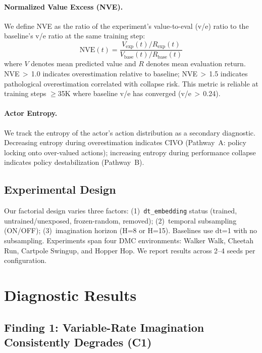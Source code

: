 \documentclass{article}
\newcommand{\dt}{\mathrm{dt}}
\newcommand{\nve}{\text{NVE}}
\begin{document}
\paragraph{Normalized Value Excess (NVE).}
We define NVE as the ratio of the experiment's value-to-eval (v/e) ratio to the baseline's v/e ratio at the same training step:
\begin{equation}
\nve(t) = \frac{V_{\text{exp}}(t) / R_{\text{exp}}(t)}{V_{\text{base}}(t) / R_{\text{base}}(t)}
\end{equation}
where $V$ denotes mean predicted value and $R$ denotes mean evaluation return.
NVE\,$>$\,1.0 indicates overestimation relative to baseline; NVE\,$>$\,1.5 indicates pathological overestimation correlated with collapse risk.
This metric is reliable at training steps $\geq$35K where baseline v/e has converged (v/e\,$>$\,0.24).

\paragraph{Actor Entropy.}
We track the entropy of the actor's action distribution as a secondary diagnostic.
Decreasing entropy during overestimation indicates CIVO (Pathway~A: policy locking onto over-valued actions); increasing entropy during performance collapse indicates policy destabilization (Pathway~B).

\subsection{Experimental Design}

Our factorial design varies three factors:
(1)~\texttt{dt\_embedding} status (trained, untrained/unexposed, frozen-random, removed);
(2)~temporal subsampling (ON/OFF);
(3)~imagination horizon (H=8 or H=15).
Baselines use $\dt$=1 with no subsampling.
Experiments span four DMC environments: Walker Walk, Cheetah Run, Cartpole Swingup, and Hopper Hop.
We report results across 2--4 seeds per configuration.

\section{Diagnostic Results}

\subsection{Finding 1: Variable-Rate Imagination Consistently Degrades (C1)}
\end{document}
